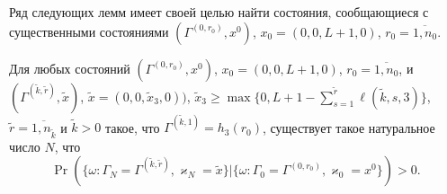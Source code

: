 \documentclass[a4paper,12pt,russian]{extarticle}
\begin{document}
Ряд следующих лемм имеет своей целью найти состояния, сообщающиеся с существенными состояниями $(\Gamma^{(0,r_0)},x^0)$, $x_0=(0,0,L+1,0)$, $r_0=\overline{1,n_0}$.
\begin{lemma}\label{incycle:states}
Для любых состояний $(\Gamma^{(0,r_0)},x^0)$, $x_0=(0,0,L+1,0)$, $r_0=\overline{1,n_0}$, и
$(\Gamma^{(\tilde{k},\tilde{r})},\tilde{x})$,
$\tilde{x}=(0,0,\tilde{x}_3,0))$, $\tilde{x}_3\geqslant\max{\{0,L+1-\sum_{s=1}^{\tilde{r}} \ell(\tilde{k},s,3)\}}$,
$\tilde{r} = \overline{1,n_{\tilde{k}}}$ 
и $\tilde{k}>0$ такое, что 
$\Gamma^{(\tilde{k},1)}=h_3(r_0)$, существует такое натуральное число $N$, что 
\begin{equation*}
\Pr(\{\omega\colon \Gamma_{N}=\Gamma^{(\tilde{k},\tilde{r} )}, \varkappa_{N}=\tilde{x}\}|\{\omega\colon 
\Gamma_{0}=\Gamma^{(0,r_0)}, \varkappa_{0}=x^0\})>0.
\end{equation*}
\end{lemma}
\end{document}
